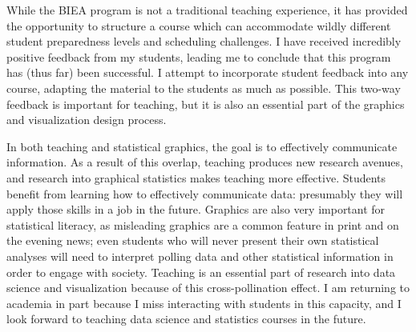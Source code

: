 \documentclass[12pt, letterpaper, sans]{moderncv}
\begin{document}
While the BIEA program is not a traditional teaching experience, it has provided the opportunity to structure a course which can accommodate wildly different student preparedness levels and scheduling challenges. I have received incredibly positive feedback from my students, leading me to conclude that this program has (thus far) been successful. I attempt to incorporate student feedback into any course, adapting the material to the students as much as possible. This two-way feedback is important for teaching, but it is also an essential part of the graphics and visualization design process. 

In both teaching and statistical graphics, the goal is to effectively communicate information. As a result of this overlap, teaching produces new research avenues, and research into graphical statistics makes teaching more effective. Students benefit from learning how to effectively communicate data:  presumably they will apply those skills in a job in the future. Graphics are also very important for statistical literacy, as misleading graphics are a common feature in print and on the evening news; even students who will never present their own statistical analyses will need to interpret polling data and other statistical information in order to engage with society. Teaching is an essential part of research into data science and visualization because of this cross-pollination effect. I am returning to academia in part because I miss interacting with students in this capacity, and I look forward to teaching data science and statistics courses in the future. 
\end{document}
